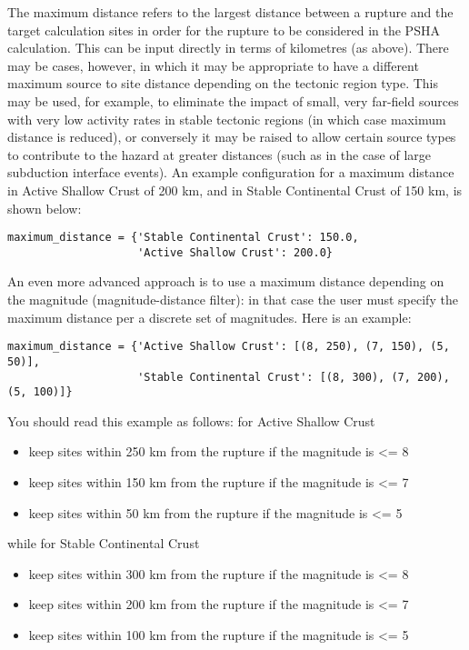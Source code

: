 The maximum distance refers to the largest distance between a rupture and the
target calculation sites in order for the rupture to be considered in the PSHA
calculation. This can be input directly in terms of kilometres (as above).
There may be cases, however, in which it may be appropriate to have a
different maximum source to site distance depending on the tectonic region
type. This may be used, for example, to eliminate the impact of small, very
far-field sources with very low activity rates in stable tectonic regions (in
which case maximum distance is reduced), or conversely it may be raised to
allow certain source types to contribute to the hazard at greater distances
(such as in the case of large subduction interface events). An example
configuration for a maximum distance in Active Shallow Crust of 200 km, and in
Stable Continental Crust of 150 km, is shown below:

\begin{verbatim}
maximum_distance = {'Stable Continental Crust': 150.0,
                    'Active Shallow Crust': 200.0}
\end{verbatim}

An even more advanced approach is to use a maximum distance depending on the
magnitude (magnitude-distance filter): in that case the user must specify
the maximum distance per a discrete set of magnitudes. Here is an
example:

\begin{verbatim}
maximum_distance = {'Active Shallow Crust': [(8, 250), (7, 150), (5, 50)],
                    'Stable Continental Crust': [(8, 300), (7, 200), (5, 100)]}
\end{verbatim}

You should read this example as follows: for Active Shallow Crust

\begin{itemize}
\item keep sites within 250 km from the rupture if the magnitude is <= 8
\item keep sites within 150 km from the rupture if the magnitude is <= 7
\item keep sites within 50 km from the rupture if the magnitude is <= 5
\end{itemize}

while for Stable Continental Crust

\begin{itemize}
\item keep sites within 300 km from the rupture if the magnitude is <= 8
\item keep sites within 200 km from the rupture if the magnitude is <= 7
\item keep sites within 100 km from the rupture if the magnitude is <= 5
\end{itemize}

